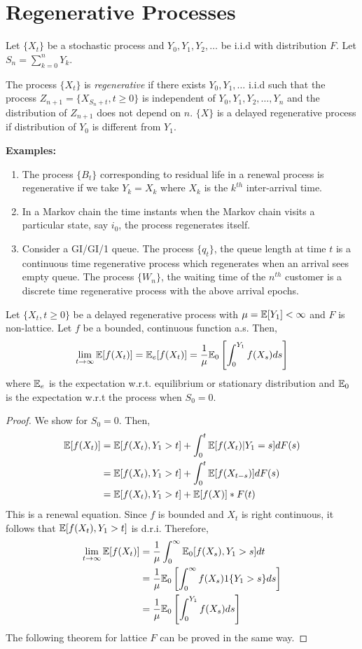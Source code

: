 \documentclass[all-lectures.tex]{subfiles}
\begin{document}
\section{Regenerative Processes}
Let $\{X_t\}$ be a stochastic process and $Y_0,Y_1,Y_2,\dots$ be i.i.d with distribution $F$. Let $S_n = \sum_{k=0}^n Y_k$.
\begin{defn}
The process $\{X_t\}$ is \textit{regenerative }if there exists $Y_0,Y_1,\dots$ i.i.d such that the process $Z_{n+1} = \{X_{S_n +t}, t\geq 0\}$ is independent of $Y_0,Y_1,Y_2,\dots,Y_n$ and the distribution of $Z_{n+1}$ does not depend on $n$. $\{X\}$ is a delayed regenerative process if distribution of $Y_0$ is different from $Y_1$.
\end{defn}
\indent \textbf{Examples:} 
\begin{enumerate}
\item The process $\{B_t\}$ corresponding to residual life in a renewal process is regenerative if we take $Y_k = X_k$ where $X_k$ is the $k^{th}$ inter-arrival time.
\item In a Markov chain the time instants when the Markov chain visits a particular state, say $i_0$, the process regenerates itself. 
\item Consider a GI/GI/1 queue. The process $\{q_t\}$, the queue length at time $t$ is a continuous time regenerative process which regenerates when an arrival sees empty queue. The process $\{W_n\}$, the waiting time of the $n^{th}$ customer is a discrete time regenerative process with the above arrival epochs. 
\end{enumerate} 
\begin{thm}
Let $\{X_t,t\geq 0\}$ be a delayed regenerative process with $\mu = \mathbb{E}[Y_1] < \infty$ and $F$ is non-lattice. Let $f$ be a bounded,  continuous function a.s. Then,
\begin{align*}
\lim_{t\to \infty} \mathbb{E}[f(X_t)] = \mathbb{E}_e[f(X_t)] = \frac{1}{\mu} \mathbb{E}_0\left[ \int_0^{Y_1} f(X_s) ds\right]
\end{align*}
where $\mathbb{E}_e$ is the expectation w.r.t. equilibrium or stationary distribution and $\mathbb{E}_0$ is the expectation w.r.t the process when $S_0 = 0$.
\begin{proof} We show for $S_0 = 0$. Then, 
\begin{align*}
\mathbb{E}[f(X_t)] &= \mathbb{E}[f(X_t), Y_1 > t] + \int_0^t \mathbb{E}[f(X_t)| Y_1 = s] dF(s) \\
&= \mathbb{E}[f(X_t), Y_1 > t] + \int_0^t \mathbb{E}[f(X_{t-s})] dF(s)\\
&= \mathbb{E}[f(X_t), Y_1 > t] + \mathbb{E}[f(X)]*F(t)
\end{align*}
This is a renewal equation. Since $f$ is bounded and $X_t$ is right continuous, it follows that $\mathbb{E}[f(X_t), Y_1 > t]$ is d.r.i. Therefore,
\begin{align*}
\lim_{t\to \infty} \mathbb{E}[f(X_t)] &= \frac{1}{\mu} \int_0^\infty \mathbb{E}_0[f(X_s), Y_1 >  s] dt\\
&= \frac{1}{\mu} \mathbb{E}_0\left[ \int_0^\infty f(X_s)1\{ Y_1 >  s\} ds\right]\\
&= \frac{1}{\mu} \mathbb{E}_0\left[ \int_0^{Y_1} f(X_s) ds\right] \qedhere
\end{align*}
The following theorem for lattice $F$ can be proved in the same way.
\end{proof}
\end{thm}
\end{document}
